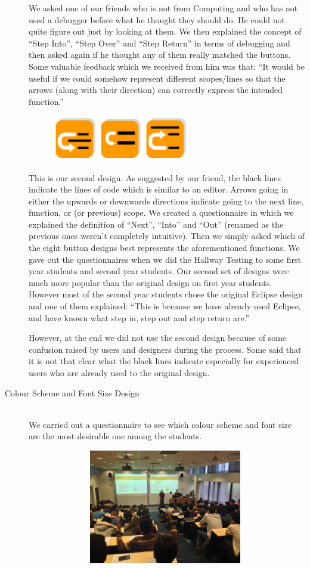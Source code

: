 \documentclass[11pt, a4paper]{article}
\begin{document}
\begin{description}
We asked one of our friends who is not from Computing and who has not used a debugger before what he thought they should do.
He could not quite figure out just by looking at them.
We then explained the concept of “Step Into”, “Step Over” and “Step Return” in terms of debugging and then asked again if he thought any of them really matched the buttons.
Some valuable feedback which we received from him was that: “It would be useful if we could somehow represent different scopes/lines so that the arrows (along with their direction) can correctly express the intended function.”
\begin{figure}[h!]
\centering
\includegraphics[height=20mm,width=60mm]{buttons2.png}
\end{figure}

This is our second design.
As suggested by our friend, the black lines indicate the lines of code which is similar to an editor. Arrows going in either the upwards or downwards directions indicate going to the next line, function, or (or previous) scope.
We created a questionnaire in which we explained the definition of “Next”, “Into” and “Out” (renamed as the previous ones weren’t completely intuitive).
Then we simply asked which of the eight button designs best represents the aforementioned functions.
We gave out the questionnaires when we did the Hallway Testing to some first year students and second year students.
Our second set of designs were much more popular than the original design on first year students.
However most of the second year students chose the original Eclipse design and one of them explained: “This is because we have already used Eclipse, and have known what step in, step out and step return are.”

However, at the end we did not use the second design because of some confusion raised by users and designers during the process. Some said that it is not that clear what the black lines indicate especially for experienced users who are already used to the original design.

\item[Colour Scheme and Font Size Design] \hfill \\
We carried out a questionnaire to see which colour scheme and font size are the most desirable one among the students. 
\begin{figure}[h!]
\centering
\includegraphics[height=50mm,width=100mm]{lectureHall.jpg}
\end{figure}


\end{description}
\end{document}
